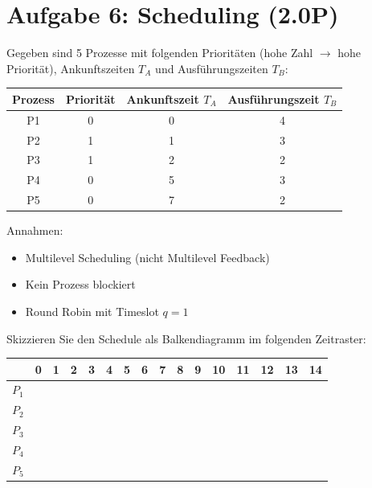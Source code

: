 \documentclass[a4paper,11pt]{article}
\begin{document}
\section{Aufgabe 6: Scheduling (2.0P)}
Gegeben sind 5 Prozesse mit folgenden Prioritäten (hohe Zahl $\rightarrow$ hohe Priorität),
Ankunftszeiten $T_A$ und Ausführungszeiten $T_B$:

\begin{center}
\begin{tabular}{|c|c|c|c|}
\hline
\textbf{Prozess} & \textbf{Priorität} & \textbf{Ankunftszeit $T_A$} & \textbf{Ausführungszeit $T_B$} \\
\hline
P1 & 0 & 0 & 4 \\
P2 & 1 & 1 & 3 \\
P3 & 1 & 2 & 2 \\
P4 & 0 & 5 & 3 \\
P5 & 0 & 7 & 2 \\
\hline
\end{tabular}
\end{center}

Annahmen:
\begin{itemize}[leftmargin=*]
  \item Multilevel Scheduling (nicht Multilevel Feedback)
  \item Kein Prozess blockiert
  \item Round Robin mit Timeslot $q=1$
\end{itemize}

Skizzieren Sie den Schedule als Balkendiagramm im folgenden Zeitraster:

\begin{center}
\begin{tabular}{|c|ccccccccccccccc|}
\hline
 & 0 & 1 & 2 & 3 & 4 & 5 & 6 & 7 & 8 & 9 & 10 & 11 & 12 & 13 & 14 \\
\hline
$P_1$ & & & & & & & & & & & & & & & \\
$P_2$ & & & & & & & & & & & & & & & \\
$P_3$ & & & & & & & & & & & & & & & \\
$P_4$ & & & & & & & & & & & & & & & \\
$P_5$ & & & & & & & & & & & & & & & \\
\hline
\end{tabular}
\end{center}
\end{document}
